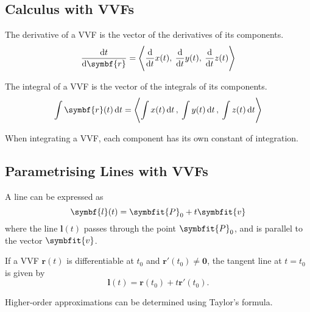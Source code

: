 \documentclass{article}
\begin{document}
\subsection{Calculus with VVFs}
\begin{theorem}
    The derivative of a VVF is the vector of the derivatives of its components.
    \begin{equation*}
        \dv{t}\symbf{r}(t) = \avec[\Bigg]{\dv{t}x(t),\: \dv{t}y(t),\: \dv{t}z(t)}
    \end{equation*}
\end{theorem}
\begin{theorem}
    The integral of a VVF is the vector of the integrals of its components.
    \begin{equation*}
        \int\symbf{r}(t)\dd{t}
        = \avec[\Bigg]{\int x(t) \dd{t},\: \int y(t) \dd{t},\: \int z(t) \dd{t}}
    \end{equation*}
\end{theorem}
\begin{remark}
    When integrating a VVF, each component has its own constant of integration.
\end{remark}
\subsection{Parametrising Lines with VVFs}
\begin{definition}
    A line can be expressed as
    \begin{equation*}
        \symbf{l}(t) = \symbfit{P}_0 + t\symbfit{v}
    \end{equation*}
    where the line \(\symbf{l}(t)\) passes through the point \(\symbfit{P}_0\), and is parallel to the vector \(\symbfit{v}\).
\end{definition}
\begin{definition}
    If a VVF \(\symbf{r}(t)\) is differentiable at
    \(t_0\) and \(\symbf{r'}(t_0)\ne\symbf{0}\), the tangent line at
    \(t=t_0\) is given by
    \begin{equation*}
        \symbf{l}(t) = \symbf{r}(t_0)+t\symbf{r'}(t_0).
    \end{equation*}
\end{definition}
\begin{remark}
    Higher-order approximations can be determined using Taylor's formula.
\end{remark}
\end{document}
